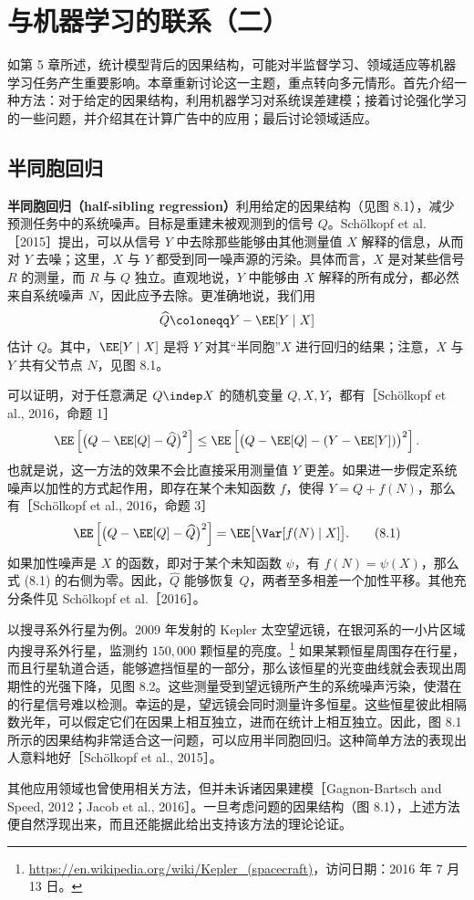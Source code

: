 \chapter{与机器学习的联系（二）}
\label{ch:machine-learning-two}

如第 5 章所述，统计模型背后的因果结构，可能对半监督学习、领域适应等机器学习任务产生重要影响。本章重新讨论这一主题，重点转向多元情形。首先介绍一种方法：对于给定的因果结构，利用机器学习对系统误差建模；接着讨论强化学习的一些问题，并介绍其在计算广告中的应用；最后讨论领域适应。

\section{半同胞回归}
\label{sec:ch08-half-sibling}

\textbf{半同胞回归（half-sibling regression）}利用给定的因果结构（见图 8.1），减少预测任务中的系统噪声。目标是重建未被观测到的信号 $Q$。Schölkopf et al.［2015］提出，可以从信号 $Y$ 中去除那些能够由其他测量值 $X$ 解释的信息，从而对 $Y$ 去噪；这里，$X$ 与 $Y$ 都受到同一噪声源的污染。具体而言，$X$ 是对某些信号 $R$ 的测量，而 $R$ 与 $Q$ 独立。直观地说，$Y$ 中能够由 $X$ 解释的所有成分，都必然来自系统噪声 $N$，因此应予去除。更准确地说，我们用
\[
 \widehat Q\coloneqq Y-\EE[Y\mid X]
\]
估计 $Q$。其中，$\EE[Y\mid X]$ 是将 $Y$ 对其“半同胞”$X$ 进行回归的结果；注意，$X$ 与 $Y$ 共有父节点 $N$，见图 8.1。



可以证明，对于任意满足 $Q\indep X$ 的随机变量 $Q,X,Y$，都有［Schölkopf et al., 2016，命题 1］
\[
 \EE\left[\bigl(Q-\EE[Q]-\widehat Q\bigr)^2\right]
 \leq \EE\left[\bigl(Q-\EE[Q]-(Y-\EE[Y])\bigr)^2\right].
\]
也就是说，这一方法的效果不会比直接采用测量值 $Y$ 更差。如果进一步假定系统噪声以加性的方式起作用，即存在某个未知函数 $f$，使得 $Y=Q+f(N)$，那么有［Schölkopf et al., 2016，命题 3］
\begin{equation}
 \EE\left[\bigl(Q-\EE[Q]-\widehat Q\bigr)^2\right]
 =\EE\bigl[\Var[f(N)\mid X]\bigr].
 \tag{8.1}
\end{equation}
如果加性噪声是 $X$ 的函数，即对于某个未知函数 $\psi$，有 $f(N)=\psi(X)$，那么式 (8.1) 的右侧为零。因此，$\widehat Q$ 能够恢复 $Q$，两者至多相差一个加性平移。其他充分条件见 Schölkopf et al.［2016］。

以搜寻系外行星为例。2009 年发射的 Kepler 太空望远镜，在银河系的一小片区域内搜寻系外行星，监测约 $150{,}000$ 颗恒星的亮度。\footnote{\url{https://en.wikipedia.org/wiki/Kepler_(spacecraft)}，访问日期：2016 年 7 月 13 日。}
如果某颗恒星周围存在行星，而且行星轨道合适，能够遮挡恒星的一部分，那么该恒星的光变曲线就会表现出周期性的光强下降，见图 8.2。这些测量受到望远镜所产生的系统噪声污染，使潜在的行星信号难以检测。幸运的是，望远镜会同时测量许多恒星。这些恒星彼此相隔数光年，可以假定它们在因果上相互独立，进而在统计上相互独立。因此，图 8.1 所示的因果结构非常适合这一问题，可以应用半同胞回归。这种简单方法的表现出人意料地好［Schölkopf et al., 2015］。



其他应用领域也曾使用相关方法，但并未诉诸因果建模［Gagnon-Bartsch and Speed, 2012；Jacob et al., 2016］。一旦考虑问题的因果结构（图 8.1），上述方法便自然浮现出来，而且还能据此给出支持该方法的理论论证。
\FloatBarrier
